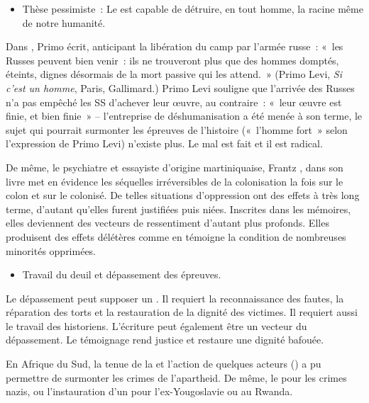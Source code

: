 {\begin{itemize}
\item Thèse pessimiste~: Le  est capable de détruire, en tout homme, la racine
même de notre humanité.
\end{itemize}

Dans , Primo écrit, anticipant la libération du camp par l'armée
russe~: «~les Russes peuvent bien venir~: ils ne trouveront plus que des hommes domptés, éteints,
dignes désormais de la mort passive qui les attend.~» (Primo Levi, \textit{Si c'est un homme}, Paris,
Gallimard.) Primo Levi souligne que l'arrivée des Russes n'a pas empêché les SS d'achever leur
œuvre, au contraire~: «~leur œuvre est finie, et bien finie~» – l'entreprise de déshumanisation a été
menée à son terme, le sujet qui pourrait surmonter les épreuves de l'histoire («~l'homme fort~» selon
l'expression de Primo Levi) n'existe plus. Le mal est fait et il est radical.

De même, le psychiatre et essayiste d'origine martiniquaise, Frantz , dans son livre
 met en évidence les séquelles irréversibles de la colonisation la fois sur le
colon et sur le colonisé. De telles situations d'oppression ont des effets à très long terme, d'autant
qu'elles furent justifiées puis niées. Inscrites dans les mémoires, elles deviennent des vecteurs de
ressentiment d'autant plus profonds. Elles produisent des effets délétères comme en témoigne la
condition de nombreuses minorités opprimées.

\begin{itemize}
\item Travail du deuil et dépassement des épreuves.
\end{itemize}

Le dépassement peut supposer un . Il requiert la reconnaissance des
fautes, la réparation des torts et la restauration de la dignité des victimes. Il requiert aussi le travail
des historiens. L'écriture peut également être un vecteur du dépassement. Le témoignage rend
justice et restaure une dignité bafouée.

En Afrique du Sud, la tenue de la  et l'action
de quelques acteurs () a pu permettre de surmonter les crimes de l'apartheid. De même, le  pour les crimes nazis, ou l'instauration d'un  pour l'ex-Yougoslavie ou au Rwanda.

}
